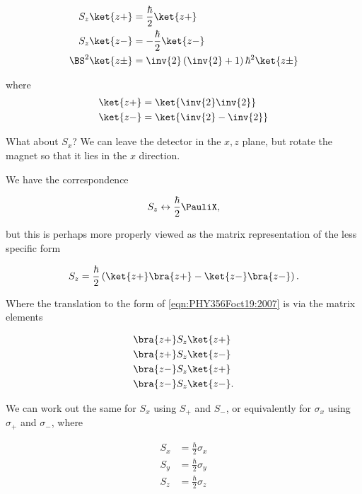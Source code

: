 \begin{align}\label{eqn:PHY356Foct19:2005}
S_z \ket{z+} &= \frac{\hbar}{2} \ket{z+} \\
S_z \ket{z-} &= -\frac{\hbar}{2} \ket{z-} \\
\BS^2 \ket{z\pm} &= \inv{2} \left( \inv{2} + 1 \right) \hbar^2 \ket{z\pm}
\end{align}

where
\begin{align}\label{eqn:PHY356Foct19:2006}
\ket{z+} &= \ket{ \inv{2} \inv{2} } \\
\ket{z-} &= \ket{ \inv{2} -\inv{2} }
\end{align}


What about $S_x$?  We can leave the detector in the $x,z$ plane, but rotate the magnet so that it lies in the $x$ direction.

We have the correspondence

\begin{align}\label{eqn:PHY356Foct19:2007}
S_z \leftrightarrow \frac{\hbar}{2} \PauliX,
\end{align}

but this is perhaps more properly viewed as the matrix representation of the less specific form

\begin{align}\label{eqn:PHY356Foct19:2008}
S_z = \frac{\hbar}{2} \left(
\ket{z+} \bra{z+}
-\ket{z-} \bra{z-}
\right).
\end{align}

Where the translation to the form of \ref{eqn:PHY356Foct19:2007} is via the matrix elements

\begin{align}\label{eqn:PHY356Foct19:2020}
&\bra{z+} S_z \ket{z+} \\
&\bra{z+} S_z \ket{z-} \\
&\bra{z-} S_z \ket{z+} \\
&\bra{z-} S_z \ket{z-}.
\end{align}

We can work out the same for $S_x$ using $S_{+}$ and $S_{-}$, or equivalently for $\sigma_x$ using $\sigma_{+}$ and $\sigma_{-}$, where

\begin{align}\label{eqn:PHY356Foct19:2009}
S_x &= \frac{\hbar}{2} \sigma_x \\
S_y &= \frac{\hbar}{2} \sigma_y \\
S_z &= \frac{\hbar}{2} \sigma_z
\end{align}

